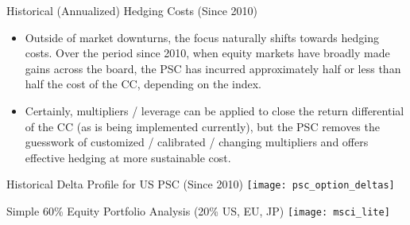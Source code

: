 \documentclass{beamer}
\begin{document}
\begin{frame}{Historical (Annualized) Hedging Costs (Since 2010)}
\begin{itemize}
\item Outside of market downturns, the focus naturally shifts towards hedging costs. Over the period since 2010, when equity markets have broadly made gains across the board, the PSC has incurred approximately half or less than half the cost of the CC, depending on the index.

\end{itemize}

\vfill

\centering
{}
\vfill
\begin{itemize}
\item Certainly, multipliers / leverage can be applied to close the return differential of the CC (as is being implemented currently), but the PSC removes the guesswork of customized / calibrated / changing multipliers and offers effective hedging at more sustainable cost.
\end{itemize}
\end{frame}

\begin{frame}{Historical Delta Profile for US PSC (Since 2010)}
\texttt{[image: psc\_option\_deltas]}
\end{frame}

\begin{frame}{Simple 60\% Equity Portfolio Analysis (20\% US, EU, JP)}
\centering
{}
\texttt{[image: msci\_lite]}
\end{frame}
\end{document}
